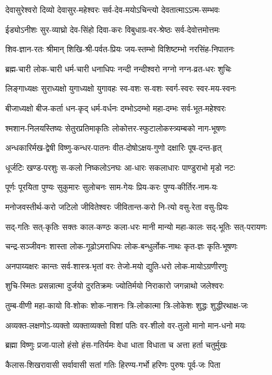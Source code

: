 \twolineshloka
{देवासुरेश्वरो दिव्यो देवासुर-महेश्वरः}
{सर्व-देव-मयोऽचिन्त्यो देवतात्माऽऽत्म-सम्भवः}

\twolineshloka
{ईड्योऽनीशः सुर-व्याघ्रो देव-सिंहो दिवा-करः}
{विबुधाग्र-वर-श्रेष्ठः सर्व-देवोत्तमोत्तमः}

\twolineshloka
{शिव-ज्ञान-रतः श्रीमान् शिखि-श्री-पर्वत-प्रियः}
{जय-स्तम्भो विशिष्टम्भो नरसिंह-निपातनः}

\twolineshloka
{ब्रह्म-चारी लोक-चारी धर्म-चारी धनाधिपः}
{नन्दी नन्दीश्वरो नग्नो नग्न-व्रत-धरः शुचिः}

\twolineshloka
{लिङ्गाध्यक्षः सुराध्यक्षो युगाध्यक्षो युगावहः}
{स्व-वशः स-वशः स्वर्ग-स्वरः स्वर-मय-स्वनः}

\twolineshloka
{बीजाध्यक्षो बीज-कर्ता धन-कृद् धर्म-वर्धनः}
{दम्भोऽदम्भो महा-दम्भः सर्व-भूत-महेश्वरः}

\twolineshloka
{श्मशान-निलयस्तिष्यः सेतुरप्रतिमाकृतिः}
{लोकोत्तर-स्फुटालोकस्त्र्यम्बको नाग-भूषणः}

\twolineshloka
{अन्धकारिर्मख-द्वेषी विष्णु-कन्धर-पातनः}
{वीत-दोषोऽक्षय-गुणो दक्षारिः पूष-दन्त-हृत्}

\twolineshloka
{धूर्जटिः खण्ड-परशुः स-कलो निष्कलोऽनघः}
{आ-धारः सकलाधारः पाण्डुराभो मृडो नटः}

\twolineshloka
{पूर्णः पूरयिता पुण्यः सुकुमारः सुलोचनः}
{साम-गेयः प्रिय-करः पुण्य-कीर्तिर-नाम-यः}

\twolineshloka
{मनोजवस्तीर्थ-करो जटिलो जीवितेश्वरः}
{जीवितान्त-करो नि-त्यो वसु-रेता वसु-प्रियः}

\twolineshloka
{सद्-गतिः सत्-कृतिः सक्तः काल-कण्ठः कला-धरः}
{मानी मान्यो महा-कालः सद्-भूतिः सत्-परायणः}

\twolineshloka
{चन्द्र-सञ्जीवनः शास्ता लोक-गूढोऽमराधिपः}
{लोक-बन्धुर्लोक-नाथः कृत-ज्ञः कृति-भूषणः}

\twolineshloka
{अनपाय्यक्षरः कान्तः सर्व-शास्त्र-भृतां वरः}
{तेजो-मयो द्युति-धरो लोक-मायोऽग्रणीरणुः}

\twolineshloka
{शुचि-स्मितः प्रसन्नात्मा दुर्जयो दुरतिक्रमः}
{ज्योतिर्मयो निराकारो जगन्नाथो जलेश्वरः}

\twolineshloka
{तुम्ब-वीणी महा-कायो वि-शोकः शोक-नाशनः}
{त्रि-लोकात्मा त्रि-लोकेशः शुद्धः शुद्धीरथाक्ष-जः}

\twolineshloka
{अव्यक्त-लक्षणोऽ-व्यक्तो व्यक्ताव्यक्तो विशां पतिः}
{वर-शीलो वर-तुलो मानो मान-धनो मयः}

\twolineshloka
{ब्रह्मा विष्णुः प्रजा-पालो हंसो हंस-गतिर्यमः}
{वेधा धाता विधाता च अत्ता हर्ता चतुर्मुखः}

\twolineshloka
{कैलास-शिखरावासी सर्वावासी सतां गतिः}
{हिरण्य-गर्भो हरिणः पुरुषः पूर्व-जः पिता}

